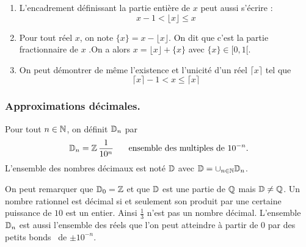 \begin{rems}
\begin{enumerate}
 \item L'encadrement définissant la partie entière de $x$ peut aussi s'écrire :
\begin{displaymath}
 x-1 < \lfloor x \rfloor \leq x
\end{displaymath}

 \item Pour tout réel $x$, on note $\{x\}=x - \lfloor x  \rfloor$. On dit que c'est la partie fractionnaire de $x$ .On a alors $x = \lfloor x  \rfloor + \{x\}$ avec $\{x\}\in [0,1[$.
 \item On peut démontrer de même l'existence et l'unicité d'un réel $\lceil x \rceil$ tel que
\begin{displaymath}
 \lceil x \rceil -1 < x \leq \lceil x \rceil
\end{displaymath}
\end{enumerate}
\end{rems}


\subsubsection{Approximations décimales.}
\begin{defi} 
Pour tout $n\in \mathbb{N}$, on définit $\mathbb{D}_n$ par  
\[
 \mathbb D_n = \mathbb{Z} \, \frac{1}{10^n} \hspace{0.5cm} \text{ ensemble des multiples de } 10^{-n}.
\]
L'ensemble des nombres décimaux est noté $\mathbb{D}$ avec $\mathbb{D} = \cup_{n\in \mathbb{N}} \mathbb{D}_n$.
\end{defi}
On peut remarquer que $\mathbb{D}_0 = \mathbb{Z}$ et que $\mathbb{D}$ est une partie de $\mathbb{Q}$ mais $\mathbb{D} \neq \mathbb{Q}$. Un nombre rationnel est décimal si et seulement son produit par une certaine puissance de $10$ est un entier. Ainsi $\frac{1}{3}$ n'est pas un nombre décimal. L'ensemble $\mathbb{D}_n$ est aussi l'ensemble des réels que l'on peut atteindre à partir de $0$ par des \og petits bonds\fg~ de $\pm 10^{-n}$.

